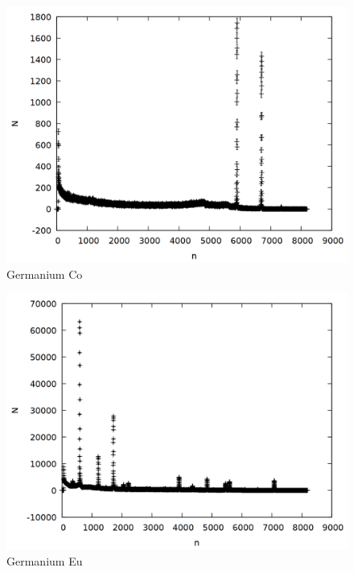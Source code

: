 \begin{figure}
\centering
\includegraphics[width=0.7\linewidth]{data/ge_co_raw.png}
\caption{Germanium Co}
\end{figure}

\begin{figure}
\centering
\includegraphics[width=0.7\linewidth]{data/ge_eu_raw.png}
\caption{Germanium Eu}
\end{figure}